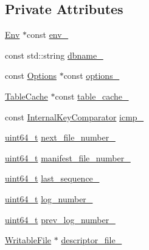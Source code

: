 \subsection*{Private Attributes}
\begin{DoxyCompactItemize}
\item 
\hyperlink{classleveldb_1_1_env}{Env} $\ast$const \hyperlink{classleveldb_1_1_version_set_a4b5d256e88de125738743c80a2a54ade}{env\-\_\-}
\item 
const std\-::string \hyperlink{classleveldb_1_1_version_set_ab52bd63a816220ba031937e291ef2be5}{dbname\-\_\-}
\item 
const \hyperlink{structleveldb_1_1_options}{Options} $\ast$const \hyperlink{classleveldb_1_1_version_set_a820c01d5891293ae45b8efb0f14b1278}{options\-\_\-}
\item 
\hyperlink{classleveldb_1_1_table_cache}{Table\-Cache} $\ast$const \hyperlink{classleveldb_1_1_version_set_afaca99abf7dea9ca06bc9dbb2f0a9ebe}{table\-\_\-cache\-\_\-}
\item 
const \hyperlink{classleveldb_1_1_internal_key_comparator}{Internal\-Key\-Comparator} \hyperlink{classleveldb_1_1_version_set_ad9440f3a41af94731f1e24954630d772}{icmp\-\_\-}
\item 
\hyperlink{stdint_8h_aaa5d1cd013383c889537491c3cfd9aad}{uint64\-\_\-t} \hyperlink{classleveldb_1_1_version_set_afaf9a4997e6fbcfa8da5daf3a6e1c220}{next\-\_\-file\-\_\-number\-\_\-}
\item 
\hyperlink{stdint_8h_aaa5d1cd013383c889537491c3cfd9aad}{uint64\-\_\-t} \hyperlink{classleveldb_1_1_version_set_aaf9c70b0087fadbc2232314cf94b2741}{manifest\-\_\-file\-\_\-number\-\_\-}
\item 
\hyperlink{stdint_8h_aaa5d1cd013383c889537491c3cfd9aad}{uint64\-\_\-t} \hyperlink{classleveldb_1_1_version_set_aafc5d34ff22f4d026860cfc9293a9d41}{last\-\_\-sequence\-\_\-}
\item 
\hyperlink{stdint_8h_aaa5d1cd013383c889537491c3cfd9aad}{uint64\-\_\-t} \hyperlink{classleveldb_1_1_version_set_a0e86a93519bf3e9d61f530dd2f0816a0}{log\-\_\-number\-\_\-}
\item 
\hyperlink{stdint_8h_aaa5d1cd013383c889537491c3cfd9aad}{uint64\-\_\-t} \hyperlink{classleveldb_1_1_version_set_a9ccd7e180391e89ee509825c5f12403d}{prev\-\_\-log\-\_\-number\-\_\-}
\item 
\hyperlink{classleveldb_1_1_writable_file}{Writable\-File} $\ast$ \hyperlink{classleveldb_1_1_version_set_a8f3566876dcd58e6f19e41e2f21bf6f7}{descriptor\-\_\-file\-\_\-}
\item 

\end{DoxyCompactItemize}

